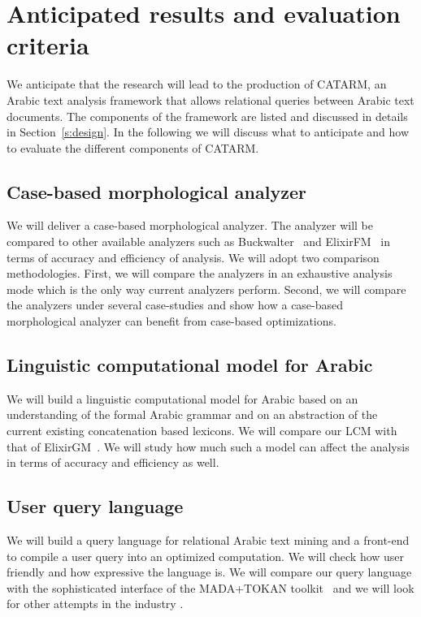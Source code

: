 \documentclass[12pt]{article}
\begin{document}
\section{Anticipated results and evaluation criteria}
\label{s:results}

We anticipate that the research will lead to the production of 
CATARM, an Arabic text analysis framework that allows relational 
queries between Arabic text documents.
The components of the framework are listed and discussed
in details in Section~\ref{s:design}. 
In the following we will discuss what to anticipate and 
how to evaluate the different components of CATARM. 

\subsection{Case-based morphological analyzer} 

We will deliver a case-based morphological analyzer. 
The analyzer will be compared to other available analyzers such as
Buckwalter~\cite{Tim04} and ElixirFM~\cite{Otakar:07} in terms
of accuracy and efficiency of analysis.
We will adopt two comparison methodologies. 
First, we will compare the analyzers in an exhaustive analysis mode
which is the only way current analyzers perform. 
Second, we will compare the analyzers under several case-studies
and show how a case-based morphological analyzer can benefit
from case-based optimizations.

\subsection{Linguistic computational model for Arabic}

We will build a linguistic computational model for Arabic 
based on an understanding of the formal Arabic grammar 
and on an abstraction of the current existing concatenation
based lexicons.
We will compare our LCM with that of ElixirGM~\cite{Otakar:07}.
We will study how much such a model can affect the analysis
in terms of accuracy and efficiency as well. 

\subsection{User query language}

We will build a query language for relational Arabic text mining 
and a front-end to compile a user query into an optimized
computation. 
We will check how user friendly and how expressive the language is.
We will compare our query language with the sophisticated 
interface of the MADA+TOKAN toolkit~\cite{Habash:09} and we will
look for other attempts in the industry . 
\end{document}
